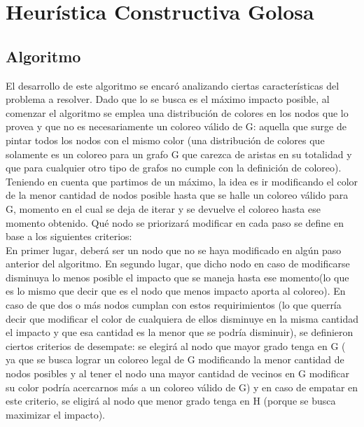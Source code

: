 \section{Heurística Constructiva Golosa}

\subsection{Algoritmo}

\indent El desarrollo de este algoritmo se encaró analizando ciertas características del problema a resolver. Dado que lo se busca es el máximo impacto posible, al comenzar el algoritmo se emplea una distribución de colores en los nodos que lo provea y que no es necesariamente un coloreo válido de G: aquella que surge de pintar todos los nodos con el mismo color (una distribución de colores que solamente es un coloreo para un grafo G que carezca de aristas en su totalidad y que para cualquier otro tipo de grafos no cumple con la definición de coloreo). \\
\indent Teniendo en cuenta que partimos de un máximo, la idea es ir modificando el color de la menor cantidad de nodos posible hasta que se halle un coloreo válido para G, momento en el cual se deja de iterar y se devuelve el coloreo hasta ese momento obtenido. Qué nodo se priorizará modificar en cada paso se define en base a los siguientes criterios:\\

\indent En primer lugar, deberá ser un nodo que no se haya modificado en algún paso anterior del algoritmo. En segundo lugar, que dicho nodo en caso de modificarse disminuya lo menos posible el impacto que se maneja hasta ese momento(lo que es lo mismo que decir que es el nodo que menos impacto aporta al coloreo). En caso de que dos o más nodos cumplan con estos requirimientos (lo que querría decir que modificar el color de cualquiera de ellos disminuye en la misma cantidad el impacto y que esa cantidad es la menor que se podría disminuir), se definieron ciertos criterios de desempate: se elegirá al nodo que mayor grado tenga en G ( ya que se busca lograr un coloreo legal de G modificando la menor cantidad de nodos posibles y al tener el nodo una mayor cantidad de vecinos en G modificar su color podría acercarnos más a un coloreo válido de G) y en caso de empatar en este criterio, se eligirá al nodo que menor grado tenga en H (porque se busca maximizar el impacto).\\

